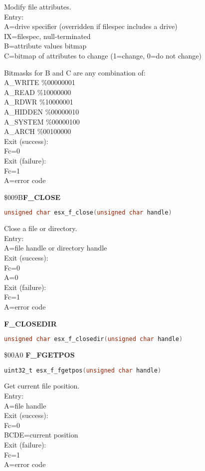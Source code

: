 Modify file attributes.\\
Entry:\\
A=drive specifier (overridden if filespec includes a drive)\\
IX=filespec, null-terminated\\
B=attribute values bitmap\\
C=bitmap of attributes to change (1=change, 0=do not change)

Bitmasks for B and C are any combination of:\\
A\_WRITE \%00000001\\
A\_READ \%10000000\\
A\_RDWR \%10000001\\
A\_HIDDEN \%00000010\\
A\_SYSTEM \%00000100\\
A\_ARCH \%00100000\\
Exit (success):\\
Fc=0\\
Exit (failure):\\
Fc=1\\
A=error code


\$009B\textbf{F\_CLOSE}

\begin{lstlisting}[language=C]
unsigned char esx_f_close(unsigned char handle)
\end{lstlisting}

Close a file or directory.\\
Entry:\\
A=file handle or directory handle\\
Exit (success):\\
Fc=0\\
A=0\\
Exit (failure):\\
Fc=1\\
A=error code

\textbf{F\_CLOSEDIR}

\begin{lstlisting}[language=C]
unsigned char esx_f_closedir(unsigned char handle)
\end{lstlisting}

\$00A0 \textbf{F\_FGETPOS}

\begin{lstlisting}[language=C]
uint32_t esx_f_fgetpos(unsigned char handle)
\end{lstlisting}

Get current file position.\\
Entry:\\
A=file handle\\
Exit (success):\\
Fc=0\\
BCDE=current position\\
Exit (failure):\\
Fc=1\\
A=error code

